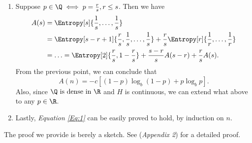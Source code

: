 \documentclass{subfiles}
\begin{document}
\begin{proof*}
\begin{enumerate}
            \item Suppose \(p \in \Q \iff p = \tfrac{r}{s}, r \le s\).
                Then we have 
                \[\begin{aligned}
                    A(s) & = \Entropy[s]{\frac{1}{s}, \ldots, \frac{1}{s}} \\ 
                        & = \Entropy[s - r + 1]{\frac{r}{s}, \frac{1}{s}, \ldots, \frac{1}{s}} 
                          + \frac{r}{s} \Entropy[r]{\frac{1}{r}, \ldots, \frac{1}{r}} \\ 
                        & = \ldots = \Entropy[2]{\frac{r}{s}, 1 - \frac{r}{s}}
                          + \frac{s - r}{s} A(s - r) + \frac{r}{s} A(s).
                \end{aligned}\]
                From the previous point, we can conclude that 
                \[
                    A(n) = -c \left\lbrack
                        (1 - p) \log_{b} (1 - p) + p \log_{b} p
                    \right\rbrack.
                \]
                Also, since \(\Q \text{ is dense in } \R\) and \(H\) is continuous,
                we can extend what above to any \(p \in \R\).

            \item Lastly, \emph{Equation \eqref{Eq:1}} can be easily proved to hold,
                by induction on \(n\).

        \end{enumerate}
    \end{proof*}
    The proof we provide is berely a sketch.
    See \cite{Shannon} (\emph{Appendix 2}) for a detailed proof.
\end{document}
